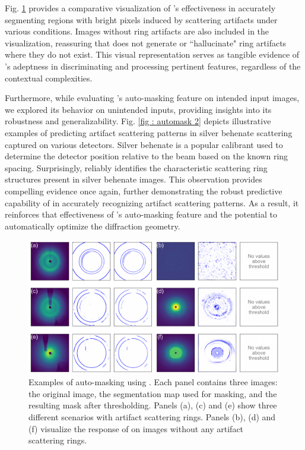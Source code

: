 \documentclass[a4paper]{article}
\begin{document}
Fig. \ref{fig : automask 1} provides a comparative visualization of \peaknet{}'s effectiveness in accurately segmenting regions with bright pixels induced by scattering artifacts under various conditions.  Images without ring artifacts are also included in the visualization, reassuring that \peaknet{} does not generate or ``hallucinate" ring artifacts where they do not exist.  This visual representation serves as tangible evidence of \peaknet{} 's adeptness in discriminating and processing pertinent features, regardless of the contextual complexities.

Furthermore, while evaluating \peaknet{}'s auto-masking feature on intended input images, we explored its behavior on unintended inputs, providing insights into its robustness and generalizability.  Fig. \ref{fig : automask 2} depicts illustrative examples of \peaknet{} predicting artifact scattering patterns in silver behenate scattering captured on various detectors. Silver behenate is a popular calibrant used to determine the detector position relative to the beam based on the known ring spacing. Surprisingly, \peaknet{} reliably identifies the characteristic scattering ring structures present in silver behenate images.  This observation provides compelling evidence once again, further demonstrating the robust predictive capability of \peaknet{} in accurately recognizing artifact scattering patterns.  As a result, it reinforces that effectiveness of \peaknet{}'s auto-masking feature and the potential to automatically optimize the diffraction geometry.


\begin{figure}[!ht]
\includegraphics[width=\textwidth,keepaspectratio]
{./figures/automask.pdf} 
\caption{Examples of auto-masking using \peaknet{}.  Each panel contains three
images: the original image, the segmentation map used for masking, and the
resulting mask after thresholding.  Panels (a), (c) and (e) show three different
scenarios with artifact scattering rings.  Panels (b), (d) and (f) visualize the
response of \peaknet{} on images without any artifact scattering rings.}
\label{fig : automask 1} 
\end{figure}
\end{document}
